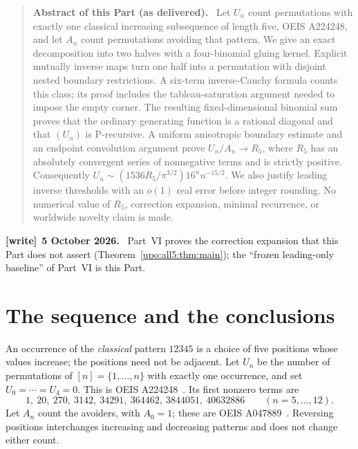 \documentclass[11pt,letterpaper]{article}
\theoremstyle{remark}\newtheorem{remark}[theorem]{Remark}
\numberwithin{equation}{section}
\newenvironment{writenote}[1][]{\par\smallskip\begingroup\small
 \noindent\textbf{[write]}\if\relax\detokenize{#1}\relax\else~\textbf{#1.}\fi\ }%
 {\par\endgroup\smallskip}
\newenvironment{partabstract}{\begin{quote}\small\noindent\textbf{Abstract of this Part (as delivered).}\ }{\end{quote}}
\begin{document}
\begin{partabstract}
Let $U_n$ count permutations with exactly one classical increasing
subsequence of length five, OEIS A224248, and let $A_n$ count permutations
avoiding that pattern. We give an exact decomposition into two halves
with a four-binomial gluing kernel. Explicit mutually inverse maps turn
one half into a permutation with disjoint nested boundary restrictions.
A six-term inverse-Cauchy formula counts this class; its proof includes
the tableau-saturation argument needed to impose the empty corner.
The resulting fixed-dimensional binomial sum proves that the ordinary
generating function is a rational diagonal and that $(U_n)$ is P-recursive.
A uniform anisotropic boundary estimate and an endpoint convolution
argument prove $U_n/A_n\to R_5$, where $R_5$ has an absolutely convergent
series of nonnegative terms and is strictly positive. Consequently
$U_n\sim (1536R_5/\pi^{3/2})16^n n^{-15/2}$. We also justify leading
inverse thresholds with an $o(1)$ real error before integer rounding.
No numerical value of $R_5$, correction expansion, minimal recurrence,
or worldwide novelty claim is made.
\end{partabstract}
\begin{writenote}[5 October 2026]
Part~VI proves the correction expansion that this Part does not assert (Theorem~\ref{upo:all5:thm:main}); the ``frozen leading-only baseline'' of Part~VI is this Part.
\end{writenote}


\section{The sequence and the conclusions}\label{upo:ex5:sec:intro}
An occurrence of the \emph{classical} pattern $12345$ is a choice of
five positions whose values increase; the positions need not be adjacent.
Let $U_n$ be the number of permutations of $[n]=\{1,\ldots,n\}$ with
exactly one occurrence, and set $U_0=\cdots=U_4=0$. This is
OEIS A224248~\cite{OEISU}. Its first nonzero terms are
\[
1,\ 20,\ 270,\ 3142,\ 34291,\ 364462,\ 3844051,\ 40632886
\qquad(n=5,\ldots,12).
\]
Let $A_n$ count the avoiders, with $A_0=1$; these are OEIS
A047889~\cite{OEISA}. Reversing positions interchanges increasing and
decreasing patterns and does not change either count.
\end{document}
